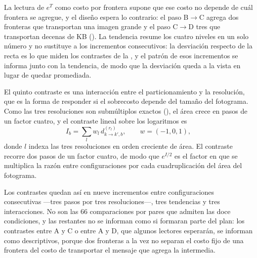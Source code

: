La lectura de $e^{T}$ como costo por frontera supone que ese costo no depende
de cuál frontera se agregue, y el diseño espera lo contrario: el paso
B$\to$C agrega dos fronteras que transportan una imagen grande y el paso
C$\to$D tres que transportan decenas de KB
(). La tendencia resume los cuatro niveles en
un solo número y no sustituye a los incrementos consecutivos: la desviación
respecto de la recta es lo que miden los contrastes de la
, y el patrón de esos incrementos se informa junto con la
tendencia, de modo que la desviación queda a la vista en lugar de quedar
promediada.

El quinto contraste es una interacción entre el particionamiento y la
resolución, que es la forma de responder si el sobrecosto depende del tamaño
del fotograma. Como las tres resoluciones son submúltiplos exactos
(), el área crece en pasos de un factor cuatro, y el
contraste lineal sobre los logaritmos es
\begin{equation}
  I_{b} = \sum_{l} w_l\, d^{(r_l)}_{k\to k',b},
  \qquad w = (-1,0,1),
  \label{eq:interaction}
\end{equation}
donde $l$ indexa las tres resoluciones en orden creciente de área. El contraste
recorre dos pasos de un factor cuatro, de modo que $e^{I/2}$ es el factor en
que se multiplica la razón entre configuraciones por cada cuadruplicación del
área del fotograma.

Los contrastes quedan así en nueve incrementos entre configuraciones
consecutivas ---tres pasos por tres resoluciones---, tres tendencias y tres
interacciones. No son las 66 comparaciones por pares que admiten las doce
condiciones, y las
restantes no se informan como si formaran parte del plan: los contrastes entre
A y C o entre A y D, que algunos lectores esperarán, se informan como
descriptivos, porque dos fronteras a la vez no separan el costo fijo de una
frontera del costo de transportar el mensaje que agrega la intermedia.

